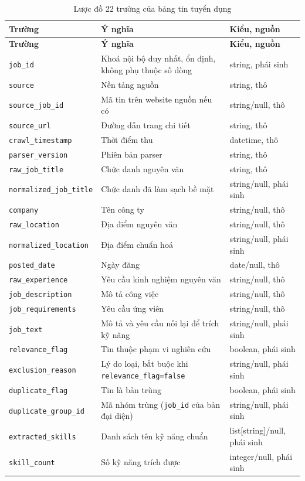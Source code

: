 \documentclass[12pt]{article}
\newcommand{\code}[1]{\texttt{#1}}
\begin{document}
{\small
\begin{longtable}{>{\raggedright\arraybackslash}p{4.4cm} >{\raggedright\arraybackslash}p{6.4cm} >{\raggedright\arraybackslash}p{4cm}}
\caption{Lược đồ 22 trường của bảng tin tuyển dụng}\label{tab:schema}\\
\toprule
\textbf{Trường} & \textbf{Ý nghĩa} & \textbf{Kiểu, nguồn} \\
\midrule
\endfirsthead
\toprule
\textbf{Trường} & \textbf{Ý nghĩa} & \textbf{Kiểu, nguồn} \\
\midrule
\endhead
\code{job\_id} & Khoá nội bộ duy nhất, ổn định, không phụ thuộc số dòng & string, phái sinh \\
\code{source} & Nền tảng nguồn & string, thô \\
\code{source\_job\_id} & Mã tin trên website nguồn nếu có & string/null, thô \\
\code{source\_url} & Đường dẫn trang chi tiết & string, thô \\
\code{crawl\_timestamp} & Thời điểm thu & datetime, thô \\
\code{parser\_version} & Phiên bản parser & string, thô \\
\code{raw\_job\_title} & Chức danh nguyên văn & string, thô \\
\code{normalized\_job\_title} & Chức danh đã làm sạch bề mặt & string/null, phái sinh \\
\code{company} & Tên công ty & string/null, thô \\
\code{raw\_location} & Địa điểm nguyên văn & string/null, thô \\
\code{normalized\_location} & Địa điểm chuẩn hoá & string/null, phái sinh \\
\code{posted\_date} & Ngày đăng & date/null, thô \\
\code{raw\_experience} & Yêu cầu kinh nghiệm nguyên văn & string/null, thô \\
\code{job\_description} & Mô tả công việc & string/null, thô \\
\code{job\_requirements} & Yêu cầu ứng viên & string/null, thô \\
\code{job\_text} & Mô tả và yêu cầu nối lại để trích kỹ năng & string/null, phái sinh \\
\code{relevance\_flag} & Tin thuộc phạm vi nghiên cứu & boolean, phái sinh \\
\code{exclusion\_reason} & Lý do loại, bắt buộc khi \code{relevance\_flag=false} & string/null, phái sinh \\
\code{duplicate\_flag} & Tin là bản trùng & boolean, phái sinh \\
\code{duplicate\_group\_id} & Mã nhóm trùng (\code{job\_id} của bản đại diện) & string/null, phái sinh \\
\code{extracted\_skills} & Danh sách tên kỹ năng chuẩn & list[string]/null, phái sinh \\
\code{skill\_count} & Số kỹ năng trích được & integer/null, phái sinh \\
\bottomrule
\end{longtable}
}
\end{document}
